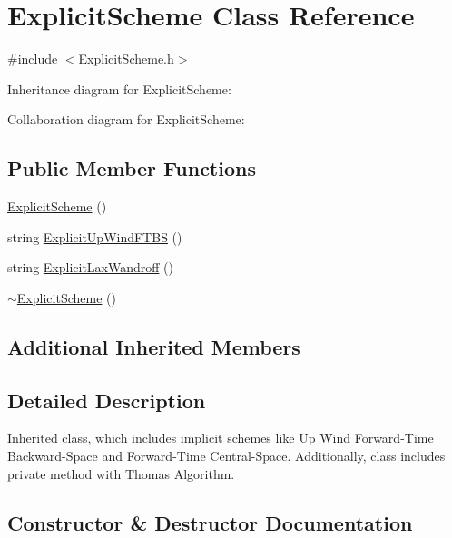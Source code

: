 \hypertarget{class_explicit_scheme}{}\section{Explicit\+Scheme Class Reference}
\label{class_explicit_scheme}


{\ttfamily \#include $<$Explicit\+Scheme.\+h$>$}



Inheritance diagram for Explicit\+Scheme\+:


Collaboration diagram for Explicit\+Scheme\+:
\subsection*{Public Member Functions}
\begin{DoxyCompactItemize}
\item 
\mbox{\hyperlink{class_explicit_scheme_ae63cfb8d333897b625dd17dc2acb4c46}{Explicit\+Scheme}} ()
\item 
string \mbox{\hyperlink{class_explicit_scheme_a52c0d19315a6014f43a9d007c70582d6}{Explicit\+Up\+Wind\+F\+T\+BS}} ()
\item 
string \mbox{\hyperlink{class_explicit_scheme_a2698e08e62763c56b972b478d665c34c}{Explicit\+Lax\+Wandroff}} ()
\item 
\mbox{\hyperlink{class_explicit_scheme_a5eee023f6f9d09609066a50dd620b49a}{$\sim$\+Explicit\+Scheme}} ()
\end{DoxyCompactItemize}
\subsection*{Additional Inherited Members}


\subsection{Detailed Description}
Inherited class, which includes implicit schemes like Up Wind Forward-\/\+Time Backward-\/\+Space and Forward-\/\+Time Central-\/\+Space. Additionally, class includes private method with Thomas Algorithm. 

\subsection{Constructor \& Destructor Documentation}
\mbox{\label{class_explicit_scheme_ae63cfb8d333897b625dd17dc2acb4c46}} 

